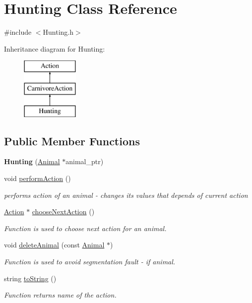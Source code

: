 \hypertarget{class_hunting}{}\section{Hunting Class Reference}
\label{class_hunting}


{\ttfamily \#include $<$Hunting.\+h$>$}

Inheritance diagram for Hunting\+:\begin{figure}[H]
\begin{center}
\leavevmode
\includegraphics[height=3.000000cm]{class_hunting}
\end{center}
\end{figure}
\subsection*{Public Member Functions}
\begin{DoxyCompactItemize}
\item 
\hypertarget{class_hunting_a21ff73dcae6aa8d18edd3134939cd7a9}{}{\bfseries Hunting} (\hyperlink{class_animal}{Animal} $\ast$animal\+\_\+ptr)\label{class_hunting_a21ff73dcae6aa8d18edd3134939cd7a9}

\item 
void \hyperlink{class_hunting_ab794e2cd49dd525b8d994d24fe7dc7ee}{perform\+Action} ()
\begin{DoxyCompactList}\small\item\em performs action of an animal -\/ changes it\textquotesingle{}s values that depends of current action \end{DoxyCompactList}\item 
\hyperlink{class_action}{Action} $\ast$ \hyperlink{class_hunting_a40b8bea137bb08979f6afd70a981cde0}{choose\+Next\+Action} ()
\begin{DoxyCompactList}\small\item\em Function is used to choose next action for an animal. \end{DoxyCompactList}\item 
void \hyperlink{class_hunting_af1736450c4ff7f8397d58e0b7aae0fa4}{delete\+Animal} (const \hyperlink{class_animal}{Animal} $\ast$)
\begin{DoxyCompactList}\small\item\em Function is used to avoid segmentation fault -\/ if animal. \end{DoxyCompactList}\item 
string \hyperlink{class_hunting_a00f665db30936ce7a96d860bd7e952a4}{to\+String} ()
\begin{DoxyCompactList}\small\item\em Function returns name of the action. \end{DoxyCompactList}\end{DoxyCompactItemize}
